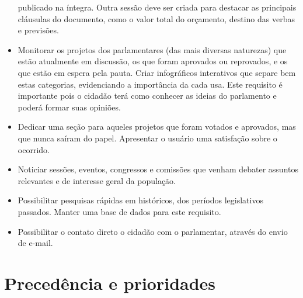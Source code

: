 \documentclass[12pt, a4paper]{article}
\begin{document}
\begin{itemize}
        publicado na íntegra. Outra sessão deve ser criada para destacar as
        principais cláusulas do documento, como o valor total do orçamento,
        destino das verbas e previsões.
        \item
        Monitorar os projetos dos parlamentares (das mais diversas naturezas)
        que estão atualmente em discussão, os que foram aprovados ou
        reprovados, e os que estão em espera pela pauta. Criar infográficos
        interativos que separe bem estas categorias, evidenciando a importância
        da cada usa. Este requisito é importante pois o cidadão terá como
        conhecer as ideias do parlamento e poderá formar suas opiniões.
        \item
        Dedicar uma seção para aqueles projetos que foram votados e aprovados,
        mas que nunca saíram do papel. Apresentar o usuário uma satisfação
        sobre o ocorrido.
        \item
        Noticiar sessões, eventos, congressos e comissões que venham debater
        assuntos relevantes e de interesse geral da população.
        \item
        Possibilitar pesquisas rápidas em históricos, dos períodos legislativos
        passados. Manter uma base de dados para este requisito.
        \item
        Possibilitar o contato direto o cidadão com o parlamentar, através do
        envio de e-mail.
    \end{itemize}

    \section{Precedência e prioridades}
\end{document}
